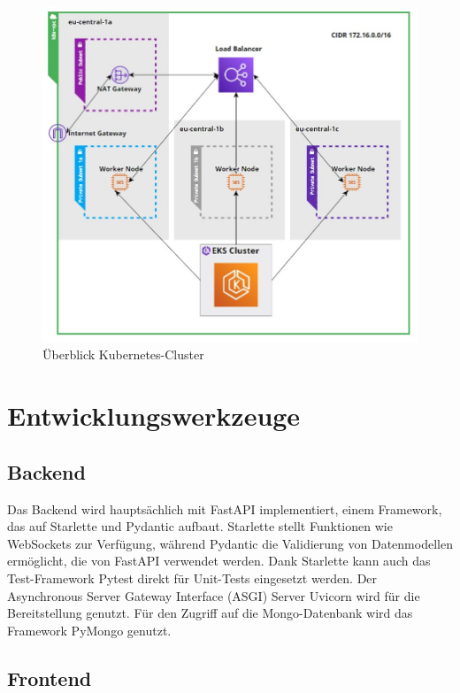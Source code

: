 \documentclass[a4paper, 10pt, conference]{IEEEtran}
\begin{document}
\begin{figure}[thp]
    \centering
    \includegraphics[width=\linewidth]{k8s}
    \caption{Überblick Kubernetes-Cluster}
    \label{fig:infra}
\end{figure}

\section{Entwicklungswerkzeuge}\label{sec:entwicklungswerkzeuge}



\subsection{Backend}\label{subsec:backend-dev-tools}
Das Backend wird hauptsächlich mit FastAPI implementiert, einem Framework, das auf Starlette \cite{starlette} und Pydantic \cite{pydantic} aufbaut. Starlette stellt Funktionen wie WebSockets zur Verfügung, während Pydantic die Validierung von Datenmodellen ermöglicht, die von FastAPI verwendet werden. Dank Starlette kann auch das Test-Framework Pytest \cite{pytest} direkt für Unit-Tests eingesetzt werden. Der Asynchronous Server Gateway Interface (ASGI) Server Uvicorn \cite{uvicorn} wird für die Bereitstellung genutzt. Für den Zugriff auf die Mongo-Datenbank wird das Framework PyMongo \cite{pymongo} genutzt. 




\subsection{Frontend}\label{subsec:frontend-dev-tools}
\end{document}
